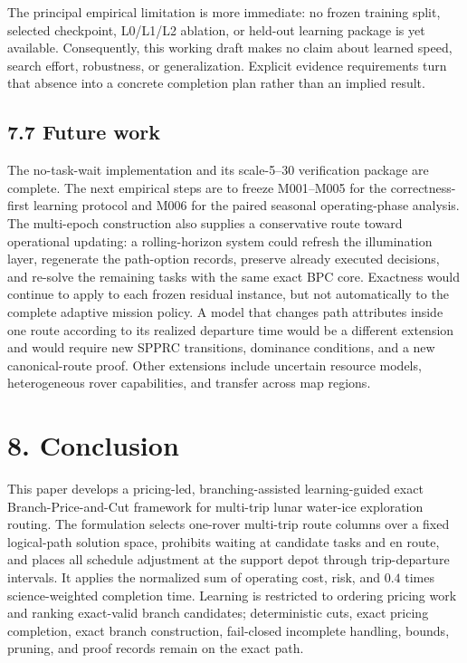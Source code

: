 \documentclass[
  11pt,
]{article}
\begin{document}
The principal empirical limitation is more immediate: no frozen training
split, selected checkpoint, L0/L1/L2 ablation, or held-out learning
package is yet available. Consequently, this working draft makes no
claim about learned speed, search effort, robustness, or generalization.
Explicit evidence requirements turn that absence into a concrete
completion plan rather than an implied result.

\hypertarget{future-work}{%
\subsection{7.7 Future work}\label{future-work}}

The no-task-wait implementation and its scale-5--30 verification package
are complete. The next empirical steps are to freeze M001--M005 for the
correctness-first learning protocol and M006 for the paired seasonal
operating-phase analysis. The multi-epoch construction also supplies a
conservative route toward operational updating: a rolling-horizon system
could refresh the illumination layer, regenerate the path-option
records, preserve already executed decisions, and re-solve the remaining
tasks with the same exact BPC core. Exactness would continue to apply to
each frozen residual instance, but not automatically to the complete
adaptive mission policy. A model that changes path attributes inside one
route according to its realized departure time would be a different
extension and would require new SPPRC transitions, dominance conditions,
and a new canonical-route proof. Other extensions include uncertain
resource models, heterogeneous rover capabilities, and transfer across
map regions.

\hypertarget{conclusion}{%
\section{8. Conclusion}\label{conclusion}}

This paper develops a pricing-led, branching-assisted learning-guided
exact Branch-Price-and-Cut framework for multi-trip lunar water-ice
exploration routing. The formulation selects one-rover multi-trip route
columns over a fixed logical-path solution space, prohibits waiting at
candidate tasks and en route, and places all schedule adjustment at the
support depot through trip-departure intervals. It applies the
normalized sum of operating cost, risk, and \(0.4\) times
science-weighted completion time. Learning is restricted to ordering
pricing work and ranking exact-valid branch candidates; deterministic
cuts, exact pricing completion, exact branch construction, fail-closed
incomplete handling, bounds, pruning, and proof records remain on the
exact path.
\end{document}
